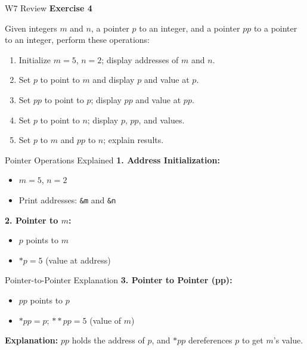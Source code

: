 \documentclass[
	11pt, %
]{beamer}
\begin{document}
\begin{frame}{W7 Review}
    \textbf{Exercise 4}

    Given integers \( m \) and \( n \), a pointer \( p \) to an integer, and a pointer \( pp \) to a pointer to an integer, perform these operations:
    \begin{enumerate}
        \item Initialize \( m = 5 \), \( n = 2 \); display addresses of \( m \) and \( n \).
        \item Set \( p \) to point to \( m \) and display \( p \) and value at \( p \).
        \item Set \( pp \) to point to \( p \); display \( pp \) and value at \( pp \).
        \item Set \( p \) to point to \( n \); display \( p \), \( pp \), and values.
        \item Set \( p \) to \( m \) and \( pp \) to \( n \); explain results.
    \end{enumerate}
\end{frame}

\begin{frame}{Pointer Operations Explained}
    \textbf{1. Address Initialization:}
    \begin{itemize}
        \item \( m = 5 \), \( n = 2 \)
        \item Print addresses: \texttt{\&m} and \texttt{\&n}
    \end{itemize}
    
    \textbf{2. Pointer to \( m \):}
    \begin{itemize}
        \item \( p \) points to \( m \)
        \item \( *p = 5 \) (value at address)
    \end{itemize}
\end{frame}

\begin{frame}{Pointer-to-Pointer Explanation}
    \textbf{3. Pointer to Pointer (pp):}
    \begin{itemize}
        \item \( pp \) points to \( p \)
        \item \( *pp = p \); \( **pp = 5 \) (value of \( m \))
    \end{itemize}
    
    \textbf{Explanation:} \( pp \) holds the address of \( p \), and \( *pp \) dereferences \( p \) to get \( m \)'s value.
\end{frame}
\end{document}
